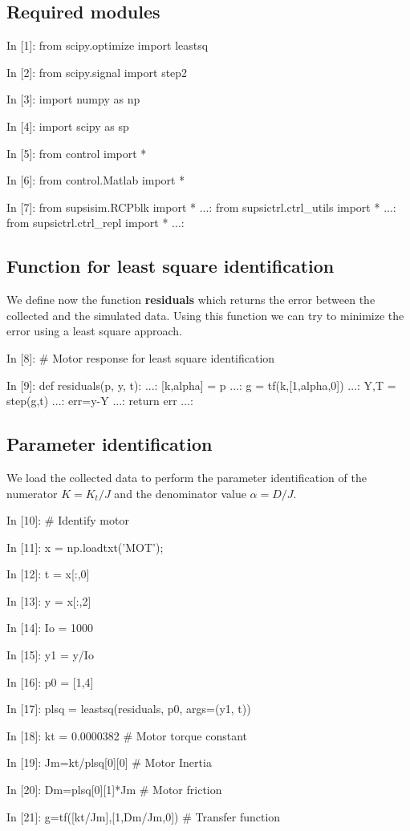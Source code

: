 \subsection{Required modules}

\begin{code}
In [1]: from scipy.optimize import leastsq

In [2]: from scipy.signal import step2

In [3]: import numpy as np

In [4]: import scipy as sp

In [5]: from control import *

In [6]: from control.Matlab import *

In [7]: from supsisim.RCPblk import *
   ...: from supsictrl.ctrl_utils import *
   ...: from supsictrl.ctrl_repl import *
   ...: 

\end{code}

\subsection{Function for least square identification}
We define now the function \textbf{residuals} which returns the error between 
the collected and the simulated data. 
Using this function we can try to minimize the error using a least square 
approach.

\begin{code}
In [8]: # Motor response for least square identification

In [9]: def residuals(p, y, t):  
   ...:     [k,alpha] = p
   ...:     g = tf(k,[1,alpha,0])
   ...:     Y,T = step(g,t)
   ...:     err=y-Y
   ...:     return err
   ...: 
\end{code}

\subsection{Parameter identification}
We load the collected data to perform the parameter identification of the 
numerator $K=K_t/J$ and the  denominator value $\alpha=D/J$.

\begin{code}
In [10]: # Identify motor

In [11]: x = np.loadtxt('MOT');

In [12]: t = x[:,0]

In [13]: y = x[:,2] 

In [14]: Io = 1000

In [15]: y1 = y/Io

In [16]: p0 = [1,4]

In [17]: plsq = leastsq(residuals, p0, args=(y1, t))

In [18]: kt = 0.0000382          # Motor torque constant

In [19]: Jm=kt/plsq[0][0]        # Motor Inertia

In [20]: Dm=plsq[0][1]*Jm        # Motor friction

In [21]: g=tf([kt/Jm],[1,Dm/Jm,0])  # Transfer function
\end{code}

